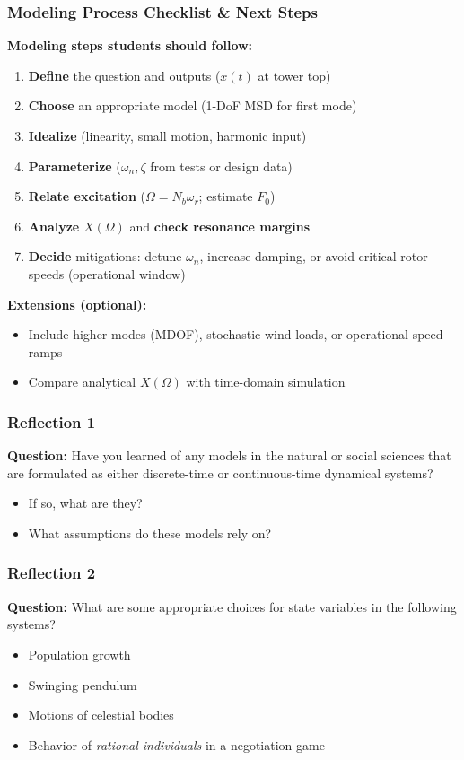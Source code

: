 \documentclass{beamer}
\begin{document}
\begin{frame}
    \frametitle{Modeling Process Checklist \& Next Steps}

    \textbf{Modeling steps students should follow:}
    \begin{enumerate}
        \item \textbf{Define} the question and outputs ($x(t)$ at tower top)
        \item \textbf{Choose} an appropriate model (1-DoF MSD for first mode)
        \item \textbf{Idealize} (linearity, small motion, harmonic input)
        \item \textbf{Parameterize} ($\omega_n, \zeta$ from tests or design data)
        \item \textbf{Relate excitation} ($\Omega = N_b \omega_r$; estimate $F_0$)
        \item \textbf{Analyze} $X(\Omega)$ and \textbf{check resonance margins}
        \item \textbf{Decide} mitigations: detune $\omega_n$, increase damping, or avoid critical rotor speeds (operational window)
    \end{enumerate}

    \textbf{Extensions (optional):}
    \begin{itemize}
        \item Include higher modes (MDOF), stochastic wind loads, or operational speed ramps
        \item Compare analytical $X(\Omega)$ with time-domain simulation
    \end{itemize}
\end{frame}

\begin{frame}
    \frametitle{Reflection 1}

    \textbf{Question:} Have you learned of any models in the natural or social sciences that are formulated as either discrete-time or continuous-time dynamical systems?

    \begin{itemize}
        \item If so, what are they?
        \item What assumptions do these models rely on?
    \end{itemize}
\end{frame}

\begin{frame}
    \frametitle{Reflection 2}

    \textbf{Question:} What are some appropriate choices for state variables in the following systems?
    \begin{itemize}
        \item Population growth
        \item Swinging pendulum
        \item Motions of celestial bodies
        \item Behavior of \emph{rational individuals} in a negotiation game
    \end{itemize}

\end{frame}
\end{document}
